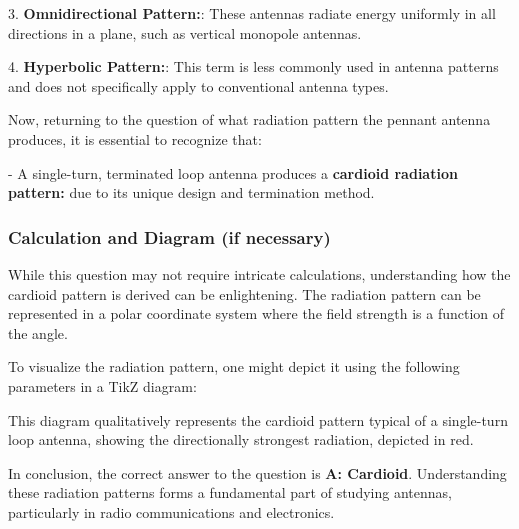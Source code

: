 3. \textbf{Omnidirectional Pattern:}: These antennas radiate energy uniformly in all directions in a plane, such as vertical monopole antennas.

4. \textbf{Hyperbolic Pattern:}: This term is less commonly used in antenna patterns and does not specifically apply to conventional antenna types.

Now, returning to the question of what radiation pattern the pennant antenna produces, it is essential to recognize that:

- A single-turn, terminated loop antenna produces a \textbf{cardioid radiation pattern:} due to its unique design and termination method.

\subsubsection{Calculation and Diagram (if necessary)}

While this question may not require intricate calculations, understanding how the cardioid pattern is derived can be enlightening. The radiation pattern can be represented in a polar coordinate system where the field strength is a function of the angle.

To visualize the radiation pattern, one might depict it using the following parameters in a TikZ diagram:

\begin{center}
\end{center}

This diagram qualitatively represents the cardioid pattern typical of a single-turn loop antenna, showing the directionally strongest radiation, depicted in red.

In conclusion, the correct answer to the question is \textbf{A: Cardioid}. Understanding these radiation patterns forms a fundamental part of studying antennas, particularly in radio communications and electronics.
